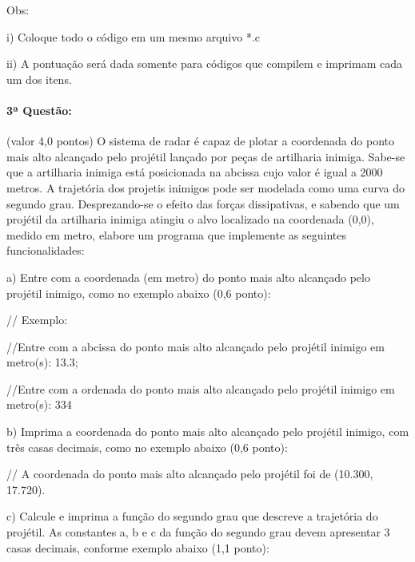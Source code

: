 \documentclass[12pt,a4paper]{article}
\begin{document}
Obs:

i) Coloque todo o código em um mesmo arquivo *.c

ii) A pontuação será dada somente para códigos que compilem e imprimam cada um dos itens.

\paragraph{3ª Questão:} (valor 4,0 pontos) O sistema de radar é capaz de plotar a coordenada do ponto mais alto alcançado pelo projétil lançado por peças de artilharia inimiga. Sabe-se que a artilharia inimiga está posicionada na abcissa cujo valor é igual a 2000 metros. A trajetória dos projetis inimigos pode ser modelada como uma curva do segundo grau. Desprezando-se o efeito das forças dissipativas, e sabendo que um projétil da artilharia inimiga atingiu o alvo localizado na coordenada (0,0), medido em metro, elabore um programa que implemente as seguintes funcionalidades:

\vspace{4mm}

a) Entre com a coordenada (em metro) do ponto mais alto alcançado pelo projétil inimigo, como
no exemplo abaixo (0,6 ponto):

\vspace{4mm}

// Exemplo:

\vspace{4mm}

//Entre com a abcissa do ponto mais alto alcançado pelo projétil inimigo em metro(s): 13.3;

\vspace{4mm}

//Entre com a ordenada do ponto mais alto alcançado pelo projétil inimigo em metro(s): 334

\vspace{4mm}

b) Imprima a coordenada do ponto mais alto alcançado pelo projétil inimigo, com três casas
decimais, como no exemplo abaixo (0,6 ponto):

\vspace{4mm}

// A coordenada do ponto mais alto alcançado pelo projétil foi de (10.300, 17.720).

\vspace{4mm}

c) Calcule e imprima a função do segundo grau que descreve a trajetória do projétil. As constantes
a, b e c da função do segundo grau devem apresentar 3 casas decimais, conforme exemplo abaixo (1,1 ponto):
\end{document}
